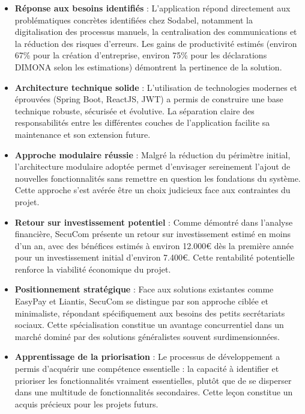 \begin{itemize}
  \item \textbf{Réponse aux besoins identifiés} : L'application répond directement aux problématiques concrètes identifiées chez Sodabel, notamment la digitalisation des processus manuels, la centralisation des communications et la réduction des risques d'erreurs. Les gains de productivité estimés (environ 67\% pour la création d'entreprise, environ 75\% pour les déclarations DIMONA selon les estimations) démontrent la pertinence de la solution.

  \item \textbf{Architecture technique solide} : L'utilisation de technologies modernes et éprouvées (Spring Boot, ReactJS, JWT) a permis de construire une base technique robuste, sécurisée et évolutive. La séparation claire des responsabilités entre les différentes couches de l'application facilite sa maintenance et son extension future.

  \item \textbf{Approche modulaire réussie} : Malgré la réduction du périmètre initial, l'architecture modulaire adoptée permet d'envisager sereinement l'ajout de nouvelles fonctionnalités sans remettre en question les fondations du système. Cette approche s'est avérée être un choix judicieux face aux contraintes du projet.

  \item \textbf{Retour sur investissement potentiel} : Comme démontré dans l'analyse financière, SecuCom présente un retour sur investissement estimé en moins d'un an, avec des bénéfices estimés à environ 12.000€ dès la première année pour un investissement initial d'environ 7.400€. Cette rentabilité potentielle renforce la viabilité économique du projet.

  \item \textbf{Positionnement stratégique} : Face aux solutions existantes comme EasyPay et Liantis, SecuCom se distingue par son approche ciblée et minimaliste, répondant spécifiquement aux besoins des petits secrétariats sociaux. Cette spécialisation constitue un avantage concurrentiel dans un marché dominé par des solutions généralistes souvent surdimensionnées.

  \item \textbf{Apprentissage de la priorisation} : Le processus de développement a permis d'acquérir une compétence essentielle : la capacité à identifier et prioriser les fonctionnalités vraiment essentielles, plutôt que de se disperser dans une multitude de fonctionnalités secondaires. Cette leçon constitue un acquis précieux pour les projets futurs.
\end{itemize}

